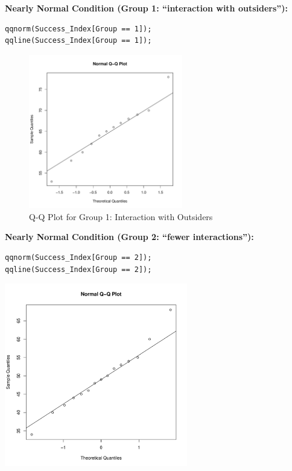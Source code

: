 \begin{example}
\vspace{0.5em}
\noindent\textbf{Nearly Normal Condition (Group 1: “interaction with outsiders”):}
\begin{tcolorbox}[colback=gray!10, colframe=black!45, arc=2mm,
  before skip=4pt, after skip=4pt]
\begin{verbatim}
qqnorm(Success_Index[Group == 1]);
qqline(Success_Index[Group == 1]);
\end{verbatim}
\end{tcolorbox}
\begin{figure}[H]
\centering
\includegraphics[width=0.6\textwidth]{section14/images/qqplot_group1.pdf}
\caption{Q-Q Plot for Group 1: Interaction with Outsiders}
\label{fig:qqplot-group1}
\end{figure}
\vspace{0.5em}
\noindent\textbf{Nearly Normal Condition (Group 2: “fewer interactions”):}
\begin{tcolorbox}[colback=gray!10, colframe=black!45, arc=2mm,
  before skip=4pt, after skip=4pt]
\begin{verbatim}
qqnorm(Success_Index[Group == 2]);
qqline(Success_Index[Group == 2]);
\end{verbatim}
\end{tcolorbox}
\noindent
\begin{minipage}{\textwidth}
\centering
\includegraphics[width=0.6\textwidth]{section14/images/qqplot_group2.pdf}
\vspace{-0.5em}


\end{minipage}
\end{example}
